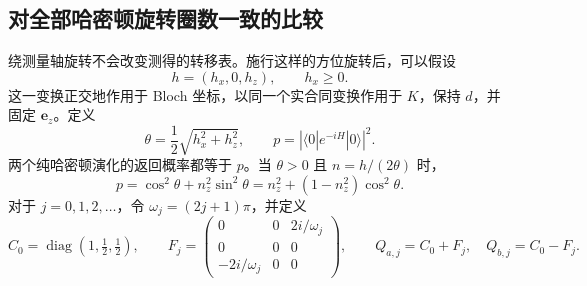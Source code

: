 \documentclass[UTF8,11pt,a4paper,fontset=fandol]{ctexart}
\theoremstyle{definition}
\theoremstyle{remark}
\DeclareMathOperator{\diag}{diag}
\newcommand{\ee}{\mathbf e_z}
\begin{document}
\subsection{对全部哈密顿旋转圈数一致的比较}
绕测量轴旋转不会改变测得的转移表。施行这样的方位旋转后，可以假设
\begin{equation}\label{eq:azimuth}
 h=(h_x,0,h_z),\qquad h_x\geq0.
\end{equation}
这一变换正交地作用于 Bloch 坐标，以同一个实合同变换作用于 \(K\)，保持 \(d\)，并固定 \(\ee\)。定义
\[
 \theta=\frac12\sqrt{h_x^2+h_z^2},\qquad
 p=\left|\langle0|e^{-iH}|0\rangle\right|^2.
\]
两个纯哈密顿演化的返回概率都等于 \(p\)。当 \(\theta>0\) 且 \(n=h/(2\theta)\) 时，
\begin{equation}\label{eq:unitary-p}
 p=\cos^2\theta+n_z^2\sin^2\theta
 =n_z^2+(1-n_z^2)\cos^2\theta.
\end{equation}
对于 \(j=0,1,2,\ldots\)，令 \(\omega_j=(2j+1)\pi\)，并定义
\begin{equation}\label{eq:QaQb}
 C_0=\diag(1,\tfrac12,\tfrac12),\qquad
 F_j=\begin{pmatrix}0&0&2i/\omega_j\\0&0&0\\-2i/\omega_j&0&0\end{pmatrix},
 \qquad Q_{a,j}=C_0+F_j,\quad Q_{b,j}=C_0-F_j.
\end{equation}
\end{document}
